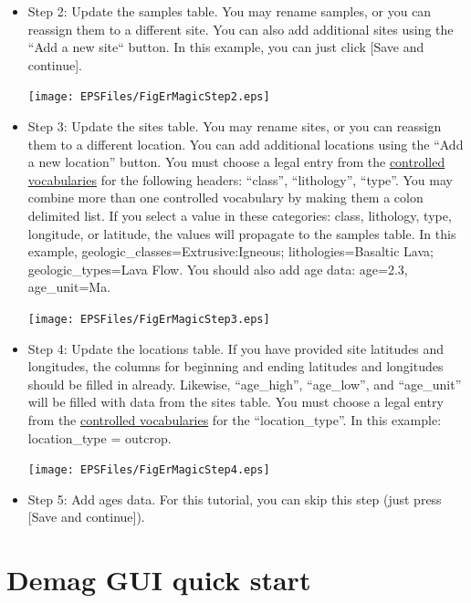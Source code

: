 \documentclass[11pt]{book}
\begin{document}
{{\begin{itemize}
 \texttt{[image: EPSFiles/FigErMagicStep1.eps]}

\item Step 2:  Update the samples table.  You may rename samples, or you can reassign them to a different site.  You can also add additional sites using the ``Add a new site`` button.  In this example, you can just click [Save and continue].

 \texttt{[image: EPSFiles/FigErMagicStep2.eps]}

\item Step 3: Update the sites table.  You may rename sites, or you can reassign them to a different location.  You can add additional locations using the ``Add a new location'' button.  You must choose a legal entry from the \href{http://earthref.org/MAGIC/shortlists.htm}{controlled vocabularies} for the following headers: ``class'', ``lithology'', ``type''. You may combine more than one controlled vocabulary by making them a colon delimited list.  If you select a value in these categories: class, lithology, type, longitude, or latitude, the values will propagate to the samples table.  In this example,  geologic_classes=Extrusive:Igneous; lithologies=Basaltic Lava; geologic_types=Lava Flow.  You should also add age data: age=2.3, age_unit=Ma.

\texttt{[image: EPSFiles/FigErMagicStep3.eps]}


\item Step 4: Update the locations table.  If you have provided site latitudes and longitudes, the columns for beginning and ending latitudes and longitudes should be filled in already. Likewise, ``age_high'', ``age_low'', and ``age_unit'' will be filled with data from the sites table.  You must choose a legal entry from the \href{http://earthref.org/MAGIC/shortlists.htm}{controlled vocabularies} for the  ``location\_type''. In this example: location\_type = outcrop.

\texttt{[image: EPSFiles/FigErMagicStep4.eps]}

\item Step 5: Add ages data.  For this tutorial, you can skip this step (just press [Save and continue]).

\end{itemize}


\section{Demag GUI quick start}
\label{sect:demag_gui}

}}
\end{document}
